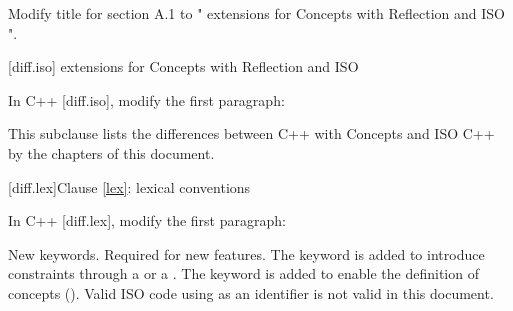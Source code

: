 \setcounter{chapter}{0}

Modify title for section A.1 to "\Cpp{} extensions for Concepts with Reflection
and ISO \CppXIV{}".

\setcounter{section}{0}
[diff.iso]{\Cpp{} extensions for Concepts with Reflection and ISO \CppXIV{}}

In C++ [diff.iso], modify the first paragraph:

\begin{std.txt}
This subclause lists the differences between C++ with  Concepts and ISO C++ by the chapters of this document.
\end{std.txt}

[diff.lex]{Clause \ref{lex}: lexical conventions}

In C++ [diff.lex], modify the first paragraph:

\begin{std.txt}
\change New keywords.
\rationale Required for new features.
The  keyword is added
to introduce constraints through a  or
a . The  keyword is
added to enable the definition of concepts ().
\effect
Valid ISO \CppXIV{} code using \added{,} 
as an identifier is not valid in this document.
\end{std.txt}

